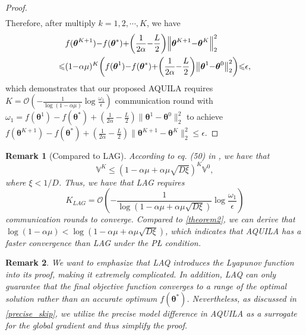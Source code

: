 \documentclass[lettersize,journal]{IEEEtran}
\newtheorem*{remark}{Remark}
\begin{document}
\begin{proof}
\begin{equation}
\begin{aligned}
\end{aligned}
\end{equation}
Therefore, after multiply $k = 1, 2, \cdots, K$, we have 
\begin{equation}
\thinmuskip=0mu
\medmuskip=0mu
\thickmuskip=0mu
\begin{aligned}
\hspace*{\fill} &f(\boldsymbol{\theta}^{K+1})-f(\boldsymbol{\theta}^*) + \left(\frac{1}{2\alpha} - \frac{L}{2}\right) \left\|\boldsymbol{\theta}^{K+1} - \boldsymbol{\theta}^{K}\right\|_2^2 \\
\leqslant& (1 -\alpha\mu)^K \left(f(\boldsymbol{\theta}^1) - f(\boldsymbol{\theta}^*)+ \left(\frac{1}{2\alpha} - \frac{L}{2}\right) \left\|\boldsymbol{\theta}^{1} - \boldsymbol{\theta}^{0}\right\|_2^2\right) \leqslant \epsilon,
\end{aligned}
\end{equation}
which demonstrates that our proposed AQUILA requires $K = \mathcal{O}\left(- \frac{1}{\log (1 - \alpha \mu)}  \log \frac{\omega_1}{\epsilon}\right)$ communication round with $\omega_1 = f(\boldsymbol{\theta}^1)-f(\boldsymbol{\theta}^{*})+\left(\frac{1}{2\alpha} - \frac{L}{2}\right) \|\boldsymbol{\theta}^{1} - \boldsymbol{\theta}^{0}\|_2^2$ to achieve $f(\boldsymbol{\theta}^{K + 1})-f(\boldsymbol{\theta}^*)+ \left(\frac{1}{2\alpha} - \frac{L}{2}\right) \|\boldsymbol{\theta}^{K+1} - \boldsymbol{\theta}^{K}\|_2^2 \leqslant \epsilon$.
\end{proof}

\begin{remark}[Compared to LAG]
According to eq. (50) in \cite{chen2018lag}, we have that
\begin{equation}
{\mathbb{V}^K} \leq \left(1- \alpha\mu + \alpha\mu\sqrt{D \xi}\right)^K {\mathbb{V}^0},
\end{equation}
where $\xi < 1 / D$. Thus, we have that LAG requires
\begin{equation}
K_{LAG} =  \mathcal{O}\left(- \frac{1}{\log (1 - \alpha \mu + \alpha\mu\sqrt{D \xi})}  \log \frac{\omega_1}{\epsilon}\right)
\end{equation}
communication rounds to converge. Compared to \cref{theorem2}, we can derive that $\log (1 - \alpha \mu) < \log (1 - \alpha \mu + \alpha\mu\sqrt{D \xi})$, which indicates that AQUILA has a faster convergence than LAG under the PŁ condition.
\end{remark}

\begin{remark}
    We want to emphasize that LAQ introduces the Lyapunov function into its proof, making it extremely complicated. In addition, LAQ can only guarantee that the final objective function converges to a range of the optimal solution rather than an accurate optimum $f(\boldsymbol{\theta}^*)$. Nevertheless, as discussed in \cref{precise_skip}, we utilize the precise model difference in AQUILA as a surrogate for the global gradient and thus simplify the proof.
\end{remark}
\end{document}
